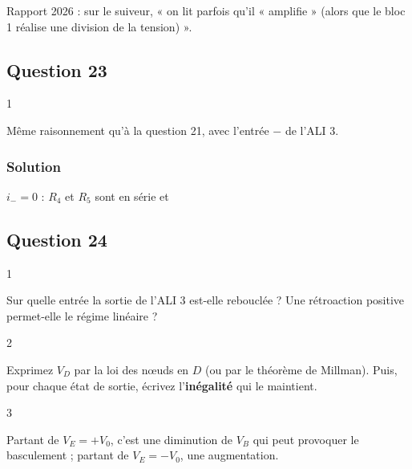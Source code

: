 \documentclass[11pt,a4paper]{article}
\newcommand{\equationajustee}[1]{%
  \sbox{\boiteequation}{$\displaystyle #1$}%
  \ifdim\wd\boiteequation>\linewidth
    \[\resizebox{\linewidth}{!}{\usebox{\boiteequation}}\]%
  \else
    \[#1\]%
  \fi}
\begin{document}
\begin{piege}

Rapport 2026 : sur le suiveur, « on lit parfois qu'il « amplifie » (alors que le bloc 1 réalise une division de la tension) ».

\end{piege}

\hypertarget{question-23}{%
\subsection{Question 23}\label{question-23}}

\begin{indication}{1}

Même raisonnement qu'à la question 21, avec l'entrée \(-\) de l'ALI 3.

\end{indication}

\hypertarget{solution-22}{%
\subsubsection{Solution}\label{solution-22}}

\(i_-=0\) : \(R_4\) et \(R_5\) sont en série et

\equationajustee{\boxed{V_C=\frac{R_5}{R_4+R_5}V_0}}

\hypertarget{question-24}{%
\subsection{Question 24}\label{question-24}}

\begin{indication}{1}

Sur quelle entrée la sortie de l'ALI 3 est-elle rebouclée ? Une rétroaction positive permet-elle le régime linéaire ?

\end{indication}

\begin{indication}{2}

Exprimez \(V_D\) par la loi des nœuds en \(D\) (ou par le théorème de Millman). Puis, pour chaque état de sortie, écrivez l'\textbf{inégalité} qui le maintient.

\end{indication}

\begin{indication}{3}

Partant de \(V_E=+V_0\), c'est une diminution de \(V_B\) qui peut provoquer le basculement ; partant de \(V_E=-V_0\), une augmentation.

\end{indication}
\end{document}
